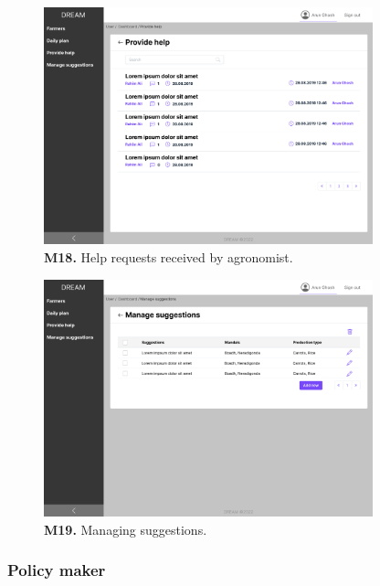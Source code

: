 \begin{figure}[H]
    \centering
    \includegraphics[width=0.85\textwidth]{mockups/Agronomist_Dashboard_Provide help.png}
    \caption{\textbf{M18.} Help requests received by agronomist.}
\end{figure}

\begin{figure}[H]
    \centering
    \includegraphics[width=0.85\textwidth]{mockups/Agronomist_Dashboard_Manage suggestions.png}
    \caption{\textbf{M19.} Managing suggestions.}
\end{figure}

\subsubsection{Policy maker}

